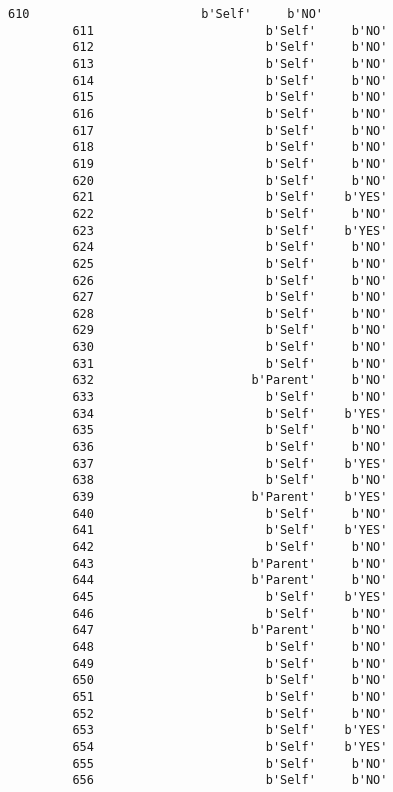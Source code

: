 \documentclass[11pt]{article}
\begin{document}
\begin{Verbatim}[commandchars=\\\{\}]
         610                        b'Self'     b'NO'  
         611                        b'Self'     b'NO'  
         612                        b'Self'     b'NO'  
         613                        b'Self'     b'NO'  
         614                        b'Self'     b'NO'  
         615                        b'Self'     b'NO'  
         616                        b'Self'     b'NO'  
         617                        b'Self'     b'NO'  
         618                        b'Self'     b'NO'  
         619                        b'Self'     b'NO'  
         620                        b'Self'     b'NO'  
         621                        b'Self'    b'YES'  
         622                        b'Self'     b'NO'  
         623                        b'Self'    b'YES'  
         624                        b'Self'     b'NO'  
         625                        b'Self'     b'NO'  
         626                        b'Self'     b'NO'  
         627                        b'Self'     b'NO'  
         628                        b'Self'     b'NO'  
         629                        b'Self'     b'NO'  
         630                        b'Self'     b'NO'  
         631                        b'Self'     b'NO'  
         632                      b'Parent'     b'NO'  
         633                        b'Self'     b'NO'  
         634                        b'Self'    b'YES'  
         635                        b'Self'     b'NO'  
         636                        b'Self'     b'NO'  
         637                        b'Self'    b'YES'  
         638                        b'Self'     b'NO'  
         639                      b'Parent'    b'YES'  
         640                        b'Self'     b'NO'  
         641                        b'Self'    b'YES'  
         642                        b'Self'     b'NO'  
         643                      b'Parent'     b'NO'  
         644                      b'Parent'     b'NO'  
         645                        b'Self'    b'YES'  
         646                        b'Self'     b'NO'  
         647                      b'Parent'     b'NO'  
         648                        b'Self'     b'NO'  
         649                        b'Self'     b'NO'  
         650                        b'Self'     b'NO'  
         651                        b'Self'     b'NO'  
         652                        b'Self'     b'NO'  
         653                        b'Self'    b'YES'  
         654                        b'Self'    b'YES'  
         655                        b'Self'     b'NO'  
         656                        b'Self'     b'NO'  

\end{Verbatim}
\end{document}
